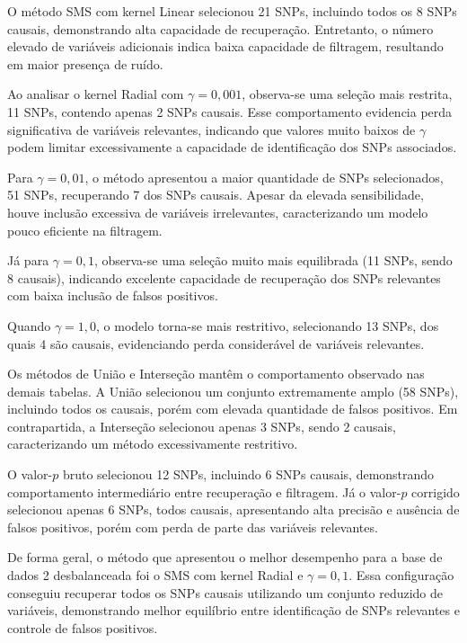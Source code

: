 \documentclass[
    12pt,
    a4paper,
    oneside,
    english,
    french,
    spanish,
    brazil
    ]{abntex2}
\begin{document}
O método SMS com kernel Linear selecionou 21 SNPs, incluindo todos os 8 SNPs causais, demonstrando alta capacidade de recuperação. Entretanto, o número elevado de variáveis adicionais indica baixa capacidade de filtragem, resultando em maior presença de ruído.

Ao analisar o kernel Radial com $\gamma = 0{,}001$, observa-se uma seleção mais restrita, 11 SNPs, contendo apenas 2 SNPs causais. Esse comportamento evidencia perda significativa de variáveis relevantes, indicando que valores muito baixos de $\gamma$ podem limitar excessivamente a capacidade de identificação dos SNPs associados.

Para $\gamma = 0{,}01$, o método apresentou a maior quantidade de SNPs selecionados, 51 SNPs, recuperando 7 dos SNPs causais. Apesar da elevada sensibilidade, houve inclusão excessiva de variáveis irrelevantes, caracterizando um modelo pouco eficiente na filtragem.

Já para $\gamma = 0{,}1$, observa-se uma seleção muito mais equilibrada (11 SNPs, sendo 8 causais), indicando excelente capacidade de recuperação dos SNPs relevantes com baixa inclusão de falsos positivos.

Quando $\gamma = 1{,}0$, o modelo torna-se mais restritivo, selecionando 13 SNPs, dos quais 4 são causais, evidenciando perda considerável de variáveis relevantes.

Os métodos de União e Interseção mantêm o comportamento observado nas demais tabelas. A União selecionou um conjunto extremamente amplo (58 SNPs), incluindo todos os causais, porém com elevada quantidade de falsos positivos. Em contrapartida, a Interseção selecionou apenas 3 SNPs, sendo 2 causais, caracterizando um método excessivamente restritivo.

O valor-$p$ bruto selecionou 12 SNPs, incluindo 6 SNPs causais, demonstrando comportamento intermediário entre recuperação e filtragem. Já o valor-$p$ corrigido selecionou apenas 6 SNPs, todos causais, apresentando alta precisão e ausência de falsos positivos, porém com perda de parte das variáveis relevantes.

De forma geral, o método que apresentou o melhor desempenho para a base de dados 2 desbalanceada foi o SMS com kernel Radial e $\gamma = 0{,}1$. Essa configuração conseguiu recuperar todos os SNPs causais utilizando um conjunto reduzido de variáveis, demonstrando melhor equilíbrio entre identificação de SNPs relevantes e controle de falsos positivos.
\end{document}
